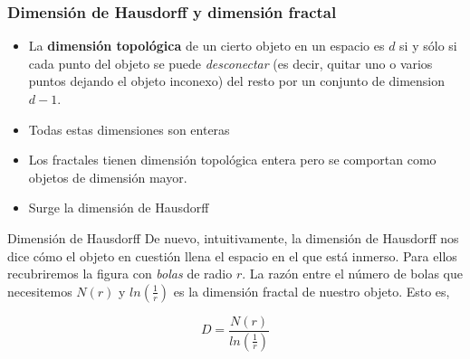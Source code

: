 \documentclass[8pt]{beamer}
\begin{document}
\subsubsection{Dimensión de Hausdorff y dimensión fractal}

\begin{frame}
\begin{itemize}
\item La \textbf{dimensión topológica} de un cierto objeto en un espacio es $d$ si y sólo si cada punto del objeto se puede \emph{desconectar} (es decir, quitar uno o varios puntos dejando el objeto inconexo) del resto por un conjunto de dimension $d-1$.

\item Todas estas dimensiones son enteras

\item Los fractales tienen dimensión topológica entera pero se comportan como objetos de dimensión mayor.

\item Surge la dimensión de Hausdorff
\end{itemize}

\begin{block}{Dimensión de Hausdorff}
De nuevo, intuitivamente, la dimensión de Hausdorff nos dice cómo el objeto en cuestión llena el espacio en el que está inmerso. Para ellos recubriremos la figura con \emph{bolas} de radio $r$. La razón entre el número de bolas que necesitemos $N(r)$ y $ln(\frac{1}{r})$ es la dimensión fractal de nuestro objeto. Esto es,

\begin{equation}
D = \frac{N(r)}{ln(\frac{1}{r})}
\end{equation}

\end{block}
\end{frame}
\end{document}
